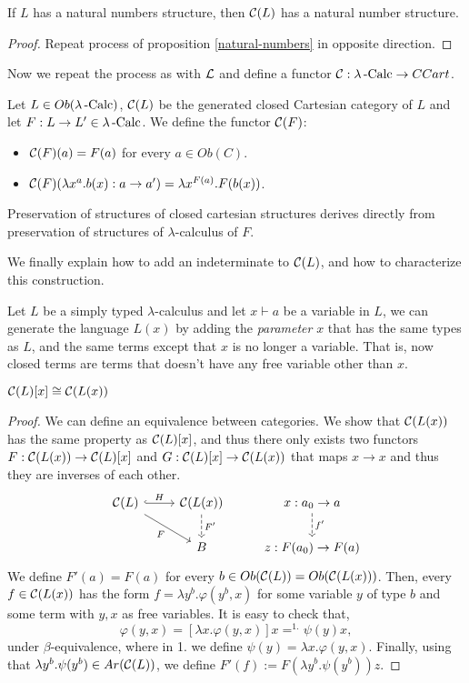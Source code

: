 \begin{proposition}
  If $L$ has a natural numbers structure, then $\mathcal{C} (L)$ has a natural number structure.
\end{proposition}
\begin{proof}
  Repeat process of proposition \ref{natural-numbers} in opposite direction.
\end{proof}
Now we repeat the process as with $\mathcal{L}$ and define a functor $\mathcal{C}: \lambda\operatorname{-Calc} \to CCart$.
\begin{definition}
  Let $L\in Ob(\lambda\operatorname{-Calc})$, $\mathcal{C} (L)$ be the generated closed Cartesian category of $L$ and let $F:L\to L'\in \lambda\operatorname{-Calc}$.  We define the functor $\mathcal{C} (F)$:
  \begin{itemize}
  \item $\mathcal{C} (F) (a) = F(a)$ for every $a\in Ob(C)$.
  \item $\mathcal{C} (F) (\lambda x^a. b(x) :a \to a') = \lambda x^{F(a)}. F(b(x))$.
  \end{itemize}
\end{definition}
\begin{remark}
  Preservation of structures of closed cartesian structures derives directly from preservation of structures of $\lambda$-calculus of $F$.
\end{remark}

We finally explain how to add an indeterminate to $\mathcal{C}(L)$, and how to characterize this construction.

\begin{definition}
  Let $L$ be a simply typed $\lambda$-calculus and let $x\vdash a$ be a variable in $L$, we can generate the language $L(x)$ by adding the \emph{parameter} $x$ that has the same types as $L$, and the same terms except that $x$ is no longer a variable. That is, now closed terms are terms that doesn't have any free variable other than $x$.
\end{definition}



\begin{proposition}
  $\mathcal{C}(L)[x] \cong \mathcal{C}(L(x))$
\end{proposition}
\begin{proof}
  We can define an equivalence between categories. We show that $\mathcal{C}(L(x))$ has the same property as $\mathcal{C}(L)[x]$, and thus there only exists two functors $F:\mathcal{C}(L(x))\to \mathcal{C}(L)[x]$  and $G:\mathcal{C}(L)[x] \to\mathcal{C}(L(x))$ that maps $x\to x$ and thus they are inverses of each other.
  \[
  \begin{tikzcd}
    \CC(L)\arrow[hookrightarrow]{r}{H} \arrow[rd, "F", swap]      & \CC(L(x)) \arrow[d, "F'", dashed]& x:a_0\to a\arrow[d,"f'",dashed]\\
    &B& z:F(a_0)\to F(a) 
  \end{tikzcd}
\]
We define $F'(a) = F(a)$ for every $b\in Ob(\mathcal{C}(L))=Ob(\mathcal{C}(L(x)))$. Then,  every $f \in \mathcal{C}(L(x))$ has the form $f = \lambda y^b. \varphi(y^b, x)$ for some variable $y$ of type $b$ and some term with $y,x$ as free variables. It is easy to check that, $$\varphi(y, x) = [\lambda x. \varphi(y,x ) ] x =^{1.} \psi(y)x,$$ under $\beta$-equivalence, where in 1. we define $\psi (y)= \lambda x. \varphi(y,x)$. Finally, using that $\lambda y^b. \psi(y^b) \in Ar(\mathcal{C}(L))$, we define $F'(f):= F(\lambda y^b. \psi(y^b)) z$.
\end{proof}
